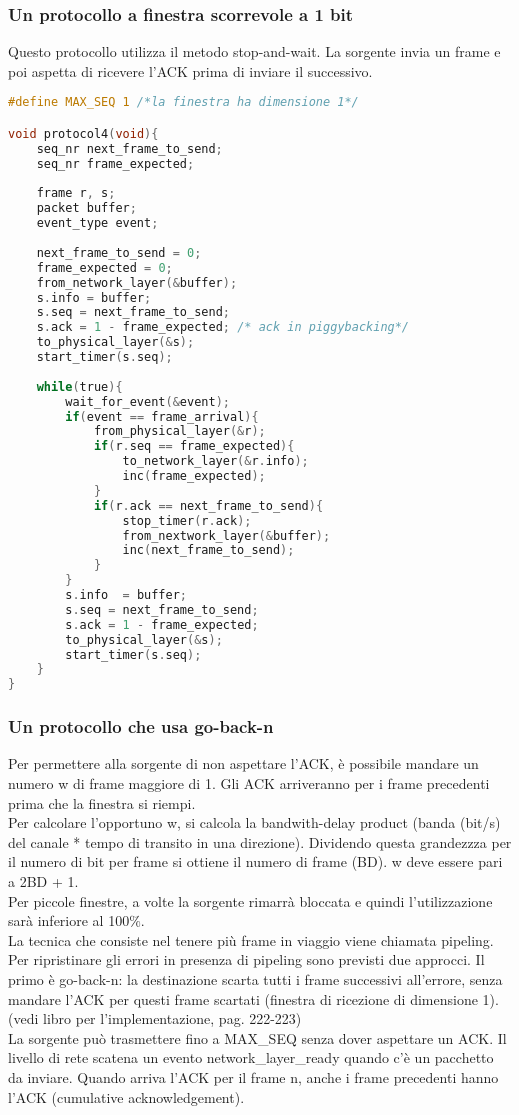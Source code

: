 \documentclass{article}
\begin{document}
\subsubsection{Un protocollo a finestra scorrevole a 1 bit}
Questo protocollo utilizza il metodo stop-and-wait. La sorgente invia un frame e poi aspetta di ricevere l'ACK prima di inviare il successivo.\\
\begin{lstlisting}[language=C, caption=protocollo a finestra scorrevole a 1 bit]
#define MAX_SEQ 1 /*la finestra ha dimensione 1*/

void protocol4(void){
	seq_nr next_frame_to_send;	
	seq_nr frame_expected;
	
	frame r, s;
	packet buffer;
	event_type event;
	
	next_frame_to_send = 0;
	frame_expected = 0;
	from_network_layer(&buffer);
	s.info = buffer;
	s.seq = next_frame_to_send;
	s.ack = 1 - frame_expected; /* ack in piggybacking*/
	to_physical_layer(&s);
	start_timer(s.seq);
	
	while(true){
		wait_for_event(&event);
		if(event == frame_arrival){
			from_physical_layer(&r);
			if(r.seq == frame_expected){
				to_network_layer(&r.info);
				inc(frame_expected);
			}
			if(r.ack == next_frame_to_send){
				stop_timer(r.ack);
				from_nextwork_layer(&buffer);
				inc(next_frame_to_send);
			}
		}
		s.info  = buffer;
		s.seq = next_frame_to_send;
		s.ack = 1 - frame_expected;
		to_physical_layer(&s);
		start_timer(s.seq);
	}
}
\end{lstlisting}
\subsubsection{Un protocollo che usa go-back-n}
Per permettere alla sorgente di non aspettare l'ACK, è possibile mandare un numero w di frame maggiore di 1. Gli ACK arriveranno per i frame precedenti prima che la finestra si riempi. \\
Per calcolare l'opportuno w, si calcola la bandwith-delay product (banda (bit/s) del canale * tempo di transito in una direzione). Dividendo questa grandezzza per il numero di bit per frame si ottiene il numero di frame (BD). w deve essere pari a 2BD + 1.\\
Per piccole finestre, a volte la sorgente rimarrà bloccata e quindi l'utilizzazione sarà inferiore al 100$\%$.\\
La tecnica che consiste nel tenere più frame in viaggio viene chiamata pipeling.
Per ripristinare gli errori in presenza di pipeling sono previsti due approcci.
Il primo è go-back-n: la destinazione scarta tutti i frame successivi all'errore, senza mandare l'ACK per questi frame scartati (finestra di ricezione di dimensione 1).\\
(vedi libro per l'implementazione, pag. 222-223)\\
La sorgente può trasmettere fino a MAX\_SEQ senza dover aspettare un ACK. Il livello di rete scatena un evento network\_layer\_ready quando c'è un pacchetto da inviare. Quando arriva l'ACK per il frame n, anche i frame precedenti hanno l'ACK (cumulative acknowledgement). 
\end{document}
